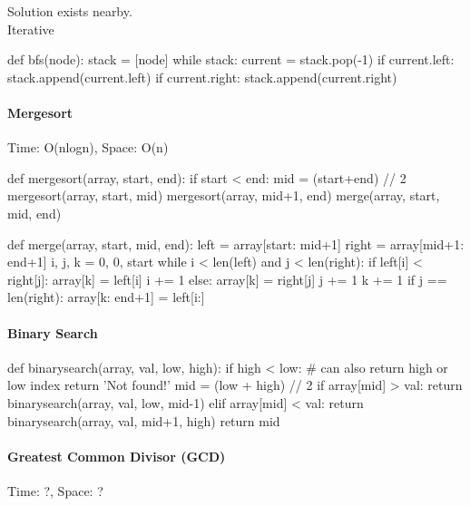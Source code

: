 \documentclass[11pt]{article}
\begin{document}
Solution exists nearby.\\

Iterative \\
\begin{python}
def bfs(node):
    stack = [node]
    while stack:
        current = stack.pop(-1)
        if current.left:
            stack.append(current.left)
        if current.right:
            stack.append(current.right)
\end{python}

\paragraph{Mergesort} Time: O(nlogn), Space: O(n)

\begin{python}
def mergesort(array, start, end):
    if start < end:
        mid = (start+end) // 2
        mergesort(array, start, mid)
        mergesort(array, mid+1, end)
        merge(array, start, mid, end)
\end{python}

\begin{python}
def merge(array, start, mid, end):
    left = array[start: mid+1]
    right = array[mid+1: end+1]
    i, j, k = 0, 0, start
    while i < len(left) and j < len(right):
        if left[i] < right[j]:
            array[k] = left[i]
            i += 1
        else:
            array[k] = right[j]
            j += 1
        k += 1
    if j == len(right):
        array[k: end+1] = left[i:]
\end{python}

\paragraph{Binary Search}

\begin{python}
def binarysearch(array, val, low, high):
    if high < low:
        # can also return high or low index
        return 'Not found!'
    mid = (low + high) // 2
    if array[mid] > val:
        return binarysearch(array, val, low, mid-1)
    elif array[mid] < val:
        return binarysearch(array, val, mid+1, high)
    return mid
\end{python}


\paragraph{Greatest Common Divisor (GCD)} Time: ?, Space: ?
\end{document}
